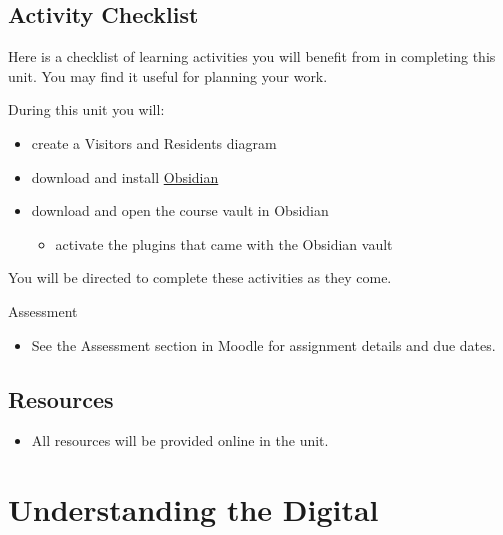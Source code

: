\documentclass[
]{book}
\providecommand{\tightlist}{%
  \setlength{\itemsep}{0pt}\setlength{\parskip}{0pt}}
\theoremstyle{definition}
\theoremstyle{definition}
\theoremstyle{definition}
\theoremstyle{definition}
\theoremstyle{remark}
\begin{document}
\hypertarget{activity-checklist}{%
\subsection*{Activity Checklist}\label{activity-checklist}}

Here is a checklist of learning activities you will benefit from in completing this unit. You may find it useful for planning your work.

\begin{reflect}
During this unit you will:

\begin{itemize}
\tightlist
\item
  create a Visitors and Residents diagram
\item
  download and install \href{https://obsidian.md}{Obsidian}
\item
  download and open the course vault in Obsidian

  \begin{itemize}
  \tightlist
  \item
    activate the plugins that came with the Obsidian vault
  \end{itemize}
\end{itemize}

You will be directed to complete these activities as they come.
\end{reflect}

\begin{assessment}
{Assessment}

\begin{itemize}
\tightlist
\item
  See the Assessment section in Moodle for assignment details and due dates.
\end{itemize}
\end{assessment}

\hypertarget{resources}{%
\subsection*{Resources}\label{resources}}

\begin{itemize}
\tightlist
\item
  All resources will be provided online in the unit.
\end{itemize}

\hypertarget{understanding-the-digital}{%
\section{Understanding the Digital}\label{understanding-the-digital}}
\end{document}

